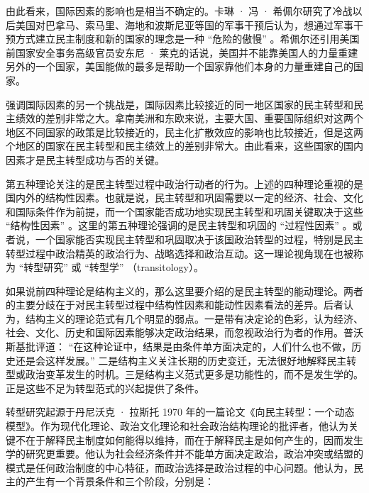 
由此看来，国际因素的影响也是相当不确定的。卡琳 · 冯 · 希佩尔研究了冷战以后美国对巴拿马、索马里、海地和波斯尼亚等国的军事干预后认为，想通过军事干预方式建立民主制度和新的国家的理念是一种 “危险的傲慢” 。希佩尔还引用美国前国家安全事务高级官员安东尼 · 莱克的话说，美国并不能靠美国人的力量重建另外的一个国家，美国能做的最多是帮助一个国家靠他们本身的力量重建自己的国家。

强调国际因素的另一个挑战是，国际因素比较接近的同一地区国家的民主转型和民主绩效的差别非常之大。拿南美洲和东欧来说，主要大国、重要国际组织对这两个地区不同国家的政策是比较接近的，民主化扩散效应的影响也比较接近，但是这两个地区的国家在民主转型和民主绩效上的差别非常大。由此看来，这些国家的国内因素才是民主转型成功与否的关键。


第五种理论关注的是民主转型过程中政治行动者的行为。上述的四种理论重视的是国内外的结构性因素。也就是说，民主转型和巩固需要以一定的经济、社会、文化和国际条件作为前提，而一个国家能否成功地实现民主转型和巩固关键取决于这些 “结构性因素” 。这里的第五种理论强调的是民主转型和巩固的 “过程性因素” 。或者说，一个国家能否实现民主转型和巩固取决于该国政治转型的过程，特别是民主转型过程中政治精英的政治行为、战略选择和政治互动。这一理论视角现在也被称为 “转型研究” 或 “转型学” （transitology）。

如果说前四种理论是结构主义的，那么这里要介绍的是民主转型的能动理论。两者的主要分歧在于对民主转型过程中结构性因素和能动性因素看法的差异。后者认为，结构主义的理论范式有几个明显的弱点。一是带有决定论的色彩，认为经济、社会、文化、历史和国际因素能够决定政治结果，而忽视政治行为者的作用。普沃斯基批评道： “在这种论证中，结果是由条件单方面决定的，人们什么也不做，历史还是会这样发展。” 二是结构主义关注长期的历史变迁，无法很好地解释民主转型或政治变革发生的时机。三是结构主义范式更多是功能性的，而不是发生学的。正是这些不足为转型范式的兴起提供了条件。

转型研究起源于丹尼沃克 · 拉斯托 1970 年的一篇论文《向民主转型：一个动态模型》。作为现代化理论、政治文化理论和社会政治结构理论的批评者，他认为关键不在于解释民主制度如何能得以维持，而在于解释民主是如何产生的，因而发生学的研究更重要。他认为社会经济条件并不能单方面决定政治，政治冲突或结盟的模式是任何政治制度的中心特征，而政治选择是政治过程的中心问题。他认为，民主的产生有一个背景条件和三个阶段，分别是：

